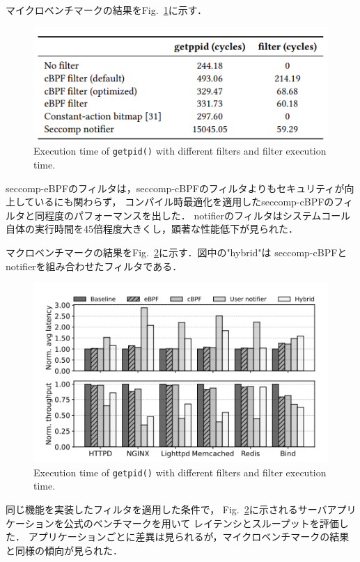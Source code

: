 \documentclass[platex,a4j,10pt,twoside,twocolumn,dvipdfmx]{jsarticle}
\newcommand{\Fref}[1]{Fig.~\ref{#1}}
\begin{document}
      マイクロベンチマークの結果を\Fref{img:micro-bench}に示す．
      \begin{figure}[tp]
        \begin{center}
          \includegraphics[width=\columnwidth]{./img/micro-bench.png}
        \end{center}
        \caption{Execution time of \texttt{getpid()} with different filters and filter execution time.}
        \label{img:micro-bench}
      \end{figure}
      seccomp-eBPFのフィルタは，seccomp-cBPFのフィルタよりもセキュリティが向上しているにも関わらず，
      コンパイル時最適化を適用したseccomp-cBPFのフィルタと同程度のパフォーマンスを出した．
      notifierのフィルタはシステムコール自体の実行時間を45倍程度大きくし，顕著な性能低下が見られた．

      マクロベンチマークの結果を\Fref{img:macro-bench}に示す．図中の"hybrid"は
      seccomp-cBPFとnotifierを組み合わせたフィルタである．
      \begin{figure}[tp]
        \begin{center}
          \includegraphics[width=\columnwidth]{./img/macro-bench.png}
        \end{center}
        \caption{Execution time of \texttt{getpid()} with different filters and filter execution time.}
        \label{img:macro-bench}
      \end{figure}
      同じ機能を実装したフィルタを適用した条件で，
      \Fref{img:macro-bench}に示されるサーバアプリケーションを公式のベンチマークを用いて
      レイテンシとスループットを評価した．
      アプリケーションごとに差異は見られるが，マイクロベンチマークの結果と同様の傾向が見られた．
  
\end{document}
